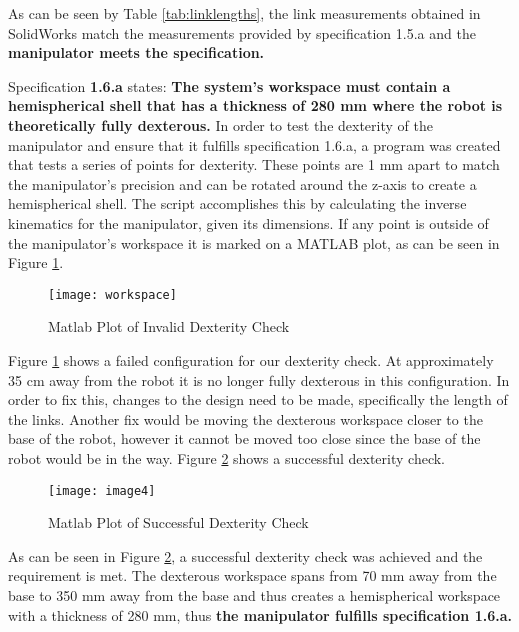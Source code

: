 As can be seen by Table \ref{tab:linklengths}, the link measurements obtained in SolidWorks match the measurements provided by specification 1.5.a and the \textbf{manipulator meets the specification. }


Specification \textbf{1.6.a} states: \textbf{The system’s workspace must contain a hemispherical shell that has a thickness of 280 mm where the robot is theoretically fully dexterous.} In order to test the dexterity of the manipulator and ensure that it fulfills specification 1.6.a, a program was created that tests a series of points for dexterity. These points are 1 mm apart to match the manipulator’s precision and can be rotated around the z-axis to create a hemispherical shell. The script accomplishes this by calculating the inverse kinematics for the manipulator, given its dimensions. If any point is outside of the manipulator’s workspace it is marked on a MATLAB plot, as can be seen in Figure \ref{fig:plot1}.

\let\clearpage\relax
\begin{figure}[htp]
  \centering
  \texttt{[image: workspace]}
  \caption{Matlab Plot of Invalid Dexterity Check}
  \label{fig:plot1}
\end{figure}

Figure \ref{fig:plot1} shows a failed configuration for our dexterity check. At approximately 35 cm away from the robot it is no longer fully dexterous in this configuration. In order to fix this, changes to the design need to be made, specifically the length of the links. Another fix would be moving the dexterous workspace closer to the base of the robot, however it cannot be moved too close since the base of the robot would be in the way. Figure \ref{fig:plot2} shows a successful dexterity check.

\begin{figure}[htp]
  \centering
  \texttt{[image: image4]}
  \caption{Matlab Plot of Successful Dexterity Check}
  \label{fig:plot2}
\end{figure}

As can be seen in Figure \ref{fig:plot2}, a successful dexterity check was achieved and the requirement is met. The dexterous workspace spans from 70 mm away from the base to 350 mm away from the base and thus creates a hemispherical workspace with a thickness of 280 mm, thus \textbf{the manipulator fulfills specification 1.6.a.}


